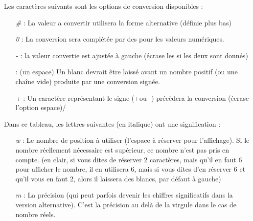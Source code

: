 \documentclass[a4paper,twoside]{article}
\begin{document}
Les caractères suivants sont les options de conversion disponibles :
\begin{itemize}
\item[\emph{\#}]: La valeur a convertir utilisera la forme alternative (définie plus bas)
\item[\emph{0}]: La conversion sera complétée par des \fg pour les valeurs numériques.
\item[\emph{-}]: la valeur convertie est ajustée à gauche (écrase les \fg si les deux sont donnés)
\item[\emph{ }]: (un espace) Un blanc devrait être laissé avant un nombre positif (ou une chaîne vide) produite par une conversion signée.
\item[\emph{+}]: Un caractère représentant le signe (\og+\fg ou \og-\fg) précèdera la conversion (écrase l'option \og espace\fg)/
\end{itemize}

Dans ce tableau, les lettres suivantes (en italique) ont une signification :
\begin{itemize}
\item[\emph{w}]: Le nombre de position à utiliser (l'espace à réserver pour l'affichage). Si le nombre réellement nécessaire est supérieur, ce nombre n'est pas pris en compte. (en clair, si vous dites de réserver 2 caractères, mais qu'il en faut 6 pour afficher le nombre, il en utilisera 6, mais si vous dites d'en réserver 6 et qu'il vous en faut 2, alors il laissera des blancs, par défaut à gauche)
\item[\emph{m}]: La précision (qui peut parfois devenir les chiffres significatifs dans la version alternative). C'est la précision au delà de la virgule dans le cas de nombre réels.
\end{itemize}
\end{document}
